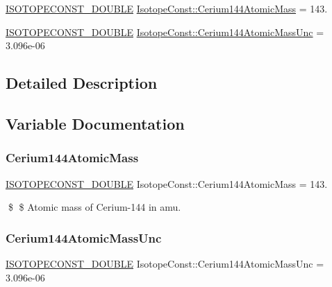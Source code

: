 \begin{DoxyCompactItemize}
\item 
\mbox{\hyperlink{group___isotope_const-_macros_ga8f45a7272ce02c0b4c65c44636ed719a}{I\+S\+O\+T\+O\+P\+E\+C\+O\+N\+S\+T\+\_\+\+D\+O\+U\+B\+LE}} \mbox{\hyperlink{group___isotope_const-_cerium-_ce144_gae10bd08bc940486b3de4ca43998d26d5}{Isotope\+Const\+::\+Cerium144\+Atomic\+Mass}} = 143.
\item 
\mbox{\hyperlink{group___isotope_const-_macros_ga8f45a7272ce02c0b4c65c44636ed719a}{I\+S\+O\+T\+O\+P\+E\+C\+O\+N\+S\+T\+\_\+\+D\+O\+U\+B\+LE}} \mbox{\hyperlink{group___isotope_const-_cerium-_ce144_ga3a42e9499b258833d1f4f2e73507d4f5}{Isotope\+Const\+::\+Cerium144\+Atomic\+Mass\+Unc}} = 3.\+096e-\/06
\end{DoxyCompactItemize}


\subsection{Detailed Description}


\subsection{Variable Documentation}
\mbox{\label{group___isotope_const-_cerium-_ce144_gae10bd08bc940486b3de4ca43998d26d5}} 
\subsubsection{\texorpdfstring{Cerium144\+Atomic\+Mass}{Cerium144AtomicMass}}
{\footnotesize\ttfamily \mbox{\hyperlink{group___isotope_const-_macros_ga8f45a7272ce02c0b4c65c44636ed719a}{I\+S\+O\+T\+O\+P\+E\+C\+O\+N\+S\+T\+\_\+\+D\+O\+U\+B\+LE}} Isotope\+Const\+::\+Cerium144\+Atomic\+Mass = 143.}

\$ \$ Atomic mass of Cerium-\/144 in amu. \mbox{\label{group___isotope_const-_cerium-_ce144_ga3a42e9499b258833d1f4f2e73507d4f5}} 
\subsubsection{\texorpdfstring{Cerium144\+Atomic\+Mass\+Unc}{Cerium144AtomicMassUnc}}
{\footnotesize\ttfamily \mbox{\hyperlink{group___isotope_const-_macros_ga8f45a7272ce02c0b4c65c44636ed719a}{I\+S\+O\+T\+O\+P\+E\+C\+O\+N\+S\+T\+\_\+\+D\+O\+U\+B\+LE}} Isotope\+Const\+::\+Cerium144\+Atomic\+Mass\+Unc = 3.\+096e-\/06}

